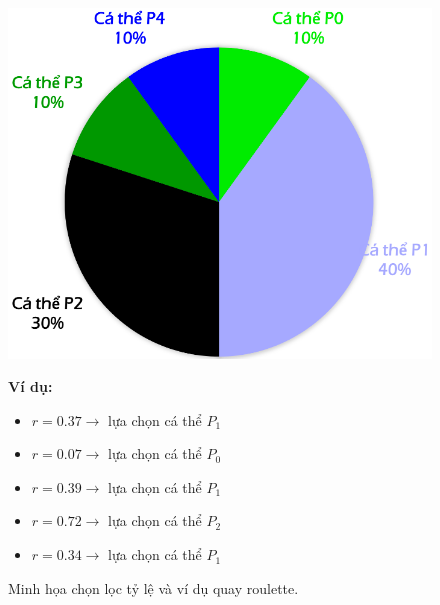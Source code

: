 \documentclass{book}
\begin{document}
\begin{figure}[H]
    \centering
    \begin{minipage}[c]{0.45\textwidth}
        \centering
        \includegraphics[width=0.7\linewidth]{images/proportional_selection_pie_2.png} 
    \end{minipage}%
    \hfill
    \begin{minipage}[c]{0.45\textwidth}
        \textbf{Ví dụ:}
        \begin{itemize}
            \item $r = 0.37 \rightarrow$ lựa chọn cá thể $P_1$
            \item $r = 0.07 \rightarrow$ lựa chọn cá thể $P_0$
            \item $r = 0.39 \rightarrow$ lựa chọn cá thể $P_1$
            \item $r = 0.72 \rightarrow$ lựa chọn cá thể $P_2$
            \item $r = 0.34 \rightarrow$ lựa chọn cá thể $P_1$
        \end{itemize}
    \end{minipage}
    \caption{Minh họa chọn lọc tỷ lệ và ví dụ quay roulette.}
    \label{fig:proportional_selection_example}
\end{figure}
\end{document}
